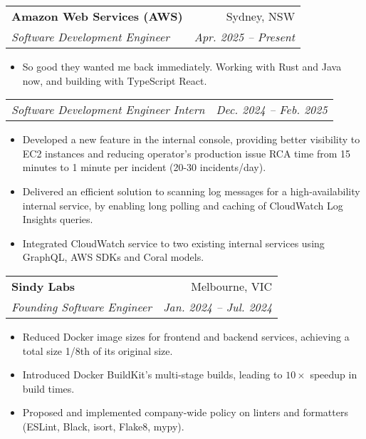 \documentclass[letterpaper,11pt]{article}
\makeatletter
\newcommand{\resumeItem}[1]{
  \item\small{
    {#1 \vspace{-2pt}}
  }
}
\newcommand{\resumeSubheading}[4]{
  \vspace{-2pt}\item
    \begin{tabular*}{0.97\textwidth}[t]{l@{\extracolsep{\fill}}r}
      \textbf{#1} & #2 \\
      \textit{\small#3} & \textit{\small #4} \\
    \end{tabular*}\vspace{-7pt}
}
\newcommand{\resumeSubSubheading}[2]{
    \item
    \begin{tabular*}{0.97\textwidth}{l@{\extracolsep{\fill}}r}
      \textit{\small#1} & \textit{\small #2} \\
    \end{tabular*}\vspace{-7pt}
}
\newcommand{\resumeItemListStart}{\begin{itemize}}
\newcommand{\resumeItemListEnd}{\end{itemize}\vspace{-5pt}}
\makeatother
\begin{document}
\resumeSubheading
{Amazon Web Services (AWS)}{Sydney, NSW}
{Software Development Engineer}{Apr. 2025 -- Present}
\resumeItemListStart
\resumeItem{So good they wanted me back immediately. Working with Rust and Java now, and building with TypeScript React.}
\resumeItemListEnd
\resumeSubSubheading
{Software Development Engineer Intern}{Dec. 2024 -- Feb. 2025}
\resumeItemListStart
\resumeItem{Developed a new feature in the internal console, providing better visibility to EC2 instances and reducing operator's production issue RCA time from 15 minutes to 1 minute per incident (20-30 incidents/day).}
\resumeItem{Delivered an efficient solution to scanning log messages for a high-availability internal service, by enabling long polling and caching of CloudWatch Log Insights queries.}
\resumeItem{Integrated CloudWatch service to two existing internal services using GraphQL, AWS SDKs and Coral models.}
\resumeItemListEnd


\resumeSubheading
{Sindy Labs}{Melbourne, VIC}
{Founding Software Engineer}{Jan. 2024 -- Jul. 2024}
\resumeItemListStart
\resumeItem{Reduced Docker image sizes for frontend and backend services, achieving a total size 1/8th of its original size.}
\resumeItem{Introduced Docker BuildKit's multi-stage builds, leading to $10\times$ speedup in build times.}
\resumeItem{Proposed and implemented company-wide policy on linters and formatters (ESLint, Black, isort, Flake8, mypy).}
\resumeItemListEnd
\end{document}
